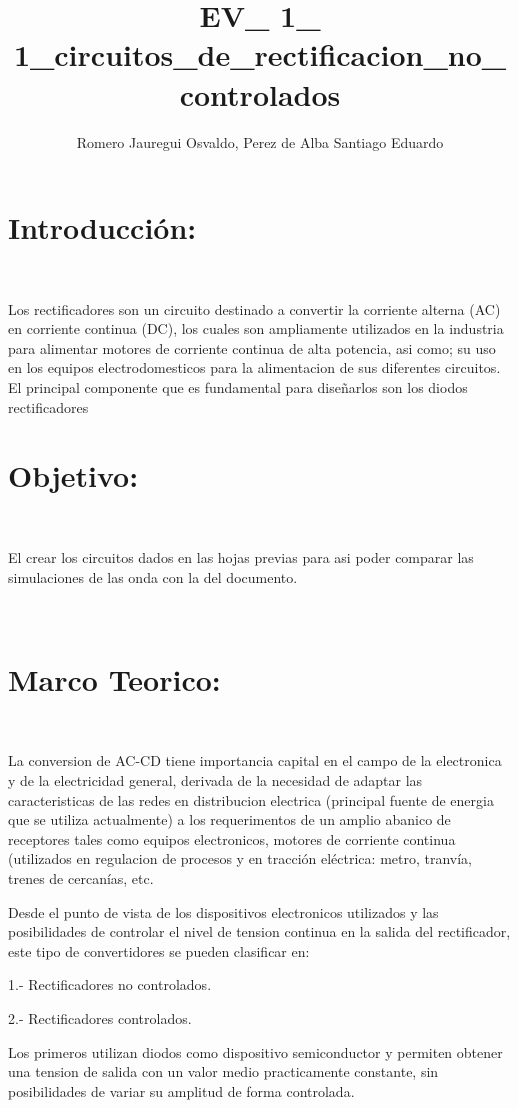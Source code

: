 \documentclass[12pt,letterpaper]{article}
\title{EV\_ 1\_ 1\_circuitos_de\_rectificacion\_no\_controlados}
\author{Romero Jauregui Osvaldo, Perez de Alba Santiago Eduardo}
\begin{document}
\maketitle

\section{Introducción:}
\

Los rectificadores son un circuito destinado a convertir la corriente alterna (AC) en corriente continua (DC), los cuales son ampliamente utilizados en la industria para alimentar motores de corriente continua de alta potencia, asi como; su uso en los equipos electrodomesticos para la alimentacion de sus diferentes circuitos. El principal componente que es fundamental para diseñarlos son los diodos rectificadores
\

\section{Objetivo:}
\

El crear los circuitos dados en las hojas previas para asi poder comparar las simulaciones de las onda con la del documento.

\

\section{Marco Teorico:}
\

La conversion de AC-CD tiene importancia capital en el campo de la electronica y de la electricidad general, derivada de la necesidad de adaptar las caracteristicas de las redes en distribucion electrica (principal fuente de energia que se utiliza actualmente) a los requerimentos de un amplio abanico de receptores tales como equipos electronicos, motores de corriente continua (utilizados en regulacion de procesos y en tracción  eléctrica: metro, tranvía, trenes de cercanías, etc.
\

Desde el punto de vista de los dispositivos electronicos utilizados y las posibilidades de controlar el nivel de tension continua en la salida del rectificador, este tipo de convertidores se pueden clasificar en:
\

1.- Rectificadores no controlados.
\

2.- Rectificadores controlados.
\

Los primeros utilizan diodos como dispositivo semiconductor y permiten obtener una tension de salida con un valor medio practicamente constante, sin posibilidades de variar su amplitud de forma controlada.
\
\end{document}
